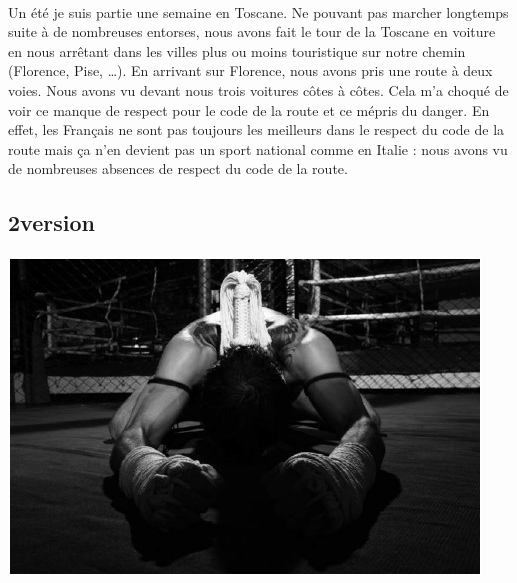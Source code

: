 \paragraph{}
Un été je suis partie une semaine en Toscane. Ne pouvant pas marcher longtemps
suite à de nombreuses entorses, nous avons fait le tour de la Toscane en
voiture en nous arrêtant dans les villes plus ou moins touristique sur notre
chemin (Florence, Pise, …).  En arrivant sur Florence, nous avons pris une
route à deux voies. Nous avons vu devant nous trois voitures côtes à côtes.
Cela m’a choqué de voir ce manque de respect pour le code de la route et ce
mépris du danger. En effet, les Français ne sont pas toujours les meilleurs
dans le respect du code de la route mais ça n’en devient pas un sport national
comme en Italie : nous avons vu de nombreuses absences de respect du code de la
route.

\subsection{2\ieme version}
\paragraph{}
\begin{center}
\includegraphics[scale=0.7]{Thai1.jpg}
\end{center}


